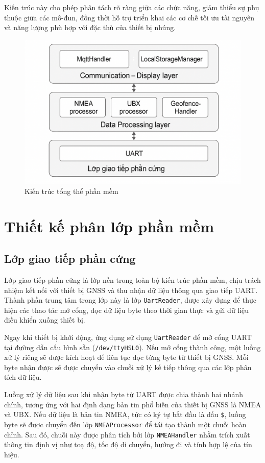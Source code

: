 \documentclass[../DoAn.tex]{subfiles}
\begin{document}
Kiến trúc này cho phép phân tách rõ ràng giữa các chức năng, giảm thiểu sự phụ thuộc giữa các mô-đun, đồng thời hỗ trợ triển khai các cơ chế tối ưu tài nguyên và năng lượng phù hợp với đặc thù của thiết bị nhúng.
\begin{figure}[H]
    \includegraphics[width=\linewidth]{Hinhve/System.png}
    \caption{Kiến trúc tổng thể phần mềm}
    \label{fig:label}
\end{figure}

\section{Thiết kế phân lớp phần mềm}
\label{section:4.2}
\subsection{Lớp giao tiếp phần cứng}
\label{subsection:4.2.1}
Lớp giao tiếp phần cứng là lớp nền trong toàn bộ kiến trúc phần mềm, chịu trách nhiệm kết nối với thiết bị GNSS và thu nhận dữ liệu thông qua giao tiếp UART. Thành phần trung tâm trong lớp này là lớp \texttt{UartReader}, được xây dựng để thực hiện các thao tác mở cổng, đọc dữ liệu byte theo thời gian thực và gửi dữ liệu điều khiển xuống thiết bị.

Ngay khi thiết bị khởi động, ứng dụng sử dụng \texttt{UartReader} để mở cổng UART tại đường dẫn cấu hình sẵn (\texttt{/dev/ttyHSL0}). Nếu mở cổng thành công, một luồng xử lý riêng sẽ được kích hoạt để liên tục đọc từng byte từ thiết bị GNSS. Mỗi byte nhận được sẽ được chuyển vào chuỗi xử lý kế tiếp thông qua các lớp phân tích dữ liệu.

Luồng xử lý dữ liệu sau khi nhận byte từ UART được chia thành hai nhánh chính, tương ứng với hai định dạng bản tin phổ biến của thiết bị GNSS là NMEA và UBX. Nếu dữ liệu là bản tin NMEA, tức có ký tự bắt đầu là dấu \texttt{\$}, luồng byte sẽ được chuyển đến lớp \texttt{NMEAProcessor} để tái tạo thành một chuỗi hoàn chỉnh. Sau đó, chuỗi này được phân tích bởi lớp \texttt{NMEAHandler} nhằm trích xuất thông tin định vị như toạ độ, tốc độ di chuyển, hướng đi và tính hợp lệ của tín hiệu.
\end{document}
